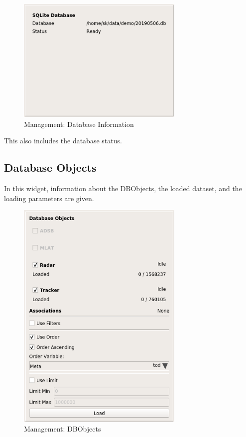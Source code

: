 \begin{figure}[H]
  \center
    \includegraphics[width=8cm,frame]{../screenshots/management_database.png}
  \caption{Management: Database Information}
\end{figure}

This also includes the database status.

\subsection{Database Objects}
\label{sec:management_dbos}

In this widget, information about the DBObjects, the loaded dataset, and the loading parameters are given.

\begin{figure}[H]
  \center
    \includegraphics[width=8cm,frame]{../screenshots/management_dbos.png}
  \caption{Management: DBObjects}
\end{figure}


